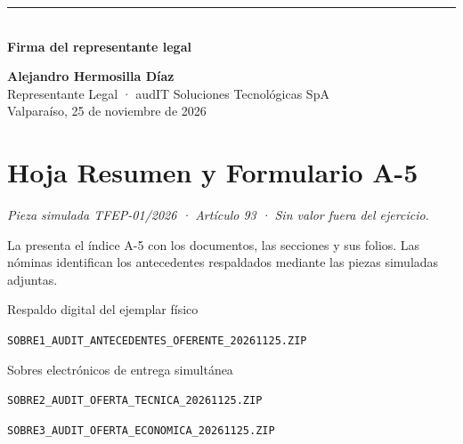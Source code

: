 \documentclass{audit-oferta}
\newcommand\rotuloSimuladoSobreUno{%
  \par\noindent\textit{Pieza simulada TFEP-01/2026 · Artículo 93 · Sin valor fuera del ejercicio.}\par\medskip}
\newcommand\lineaFirmaSobreUno{%
  \par\vspace{9mm}\noindent\rule{48mm}{0.4pt}\\
  \textbf{Firma del representante legal}\par}
\begin{document}
\vfill
\begin{center}
  \lineaFirmaSobreUno
  \textbf{Alejandro Hermosilla Díaz}\\
  Representante Legal · audIT Soluciones Tecnológicas SpA\\
  Valparaíso, 25 de noviembre de 2026
\end{center}
\clearpage

\section*{Hoja Resumen y Formulario A-5}\label{sec:s1-a5}
\rotuloSimuladoSobreUno

La  presenta el índice A-5 con los documentos, las secciones y sus folios. Las nóminas identifican los antecedentes respaldados mediante las piezas simuladas adjuntas.

\noindent Respaldo digital del ejemplar físico\par
\noindent\texttt{SOBRE1\_AUDIT\_ANTECEDENTES\_OFERENTE\_20261125.ZIP}\par
\noindent Sobres electrónicos de entrega simultánea\par
\noindent\texttt{SOBRE2\_AUDIT\_OFERTA\_TECNICA\_20261125.ZIP}\par
\noindent\texttt{SOBRE3\_AUDIT\_OFERTA\_ECONOMICA\_20261125.ZIP}\par
\end{document}
